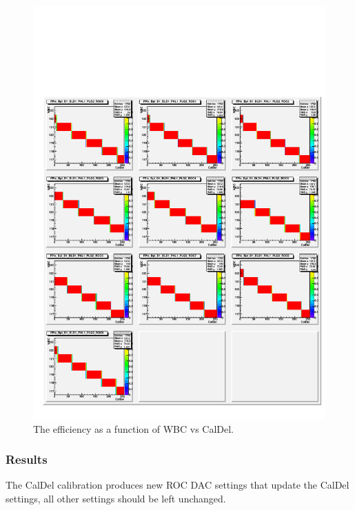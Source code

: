 \begin{figure}
\begin{center}
\includegraphics[width=\linewidth]{CalDelCalibration}
\end{center}
\caption{
The efficiency as a function of WBC vs CalDel.
}
\label{fig:caldel}
\end{figure}

\subsubsection{Results}
The CalDel calibration produces new ROC DAC settings that update the CalDel settings, all other settings should be left unchanged.


